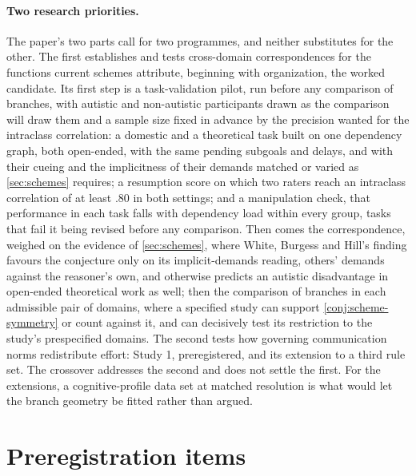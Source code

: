\paragraph{Two research priorities.} The paper's two parts call for two programmes, and neither substitutes for the other. The first establishes and tests cross-domain correspondences for the functions current schemes attribute, beginning with organization, the worked candidate. Its first step is a task-validation pilot, run before any comparison of branches, with autistic and non-autistic participants drawn as the comparison will draw them and a sample size fixed in advance by the precision wanted for the intraclass correlation: a domestic and a theoretical task built on one dependency graph, both open-ended, with the same pending subgoals and delays, and with their cueing and the implicitness of their demands matched or varied as \autoref{sec:schemes} requires; a resumption score on which two raters reach an intraclass correlation of at least $.80$ in both settings; and a manipulation check, that performance in each task falls with dependency load within every group, tasks that fail it being revised before any comparison. Then comes the correspondence, weighed on the evidence of \autoref{sec:schemes}, where White, Burgess and Hill's finding \cite{WhiteBurgessHill2009} favours the conjecture only on its implicit-demands reading, others' demands against the reasoner's own, and otherwise predicts an autistic disadvantage in open-ended theoretical work as well; then the comparison of branches in each admissible pair of domains, where a specified study can support \autoref{conj:scheme-symmetry} or count against it, and can decisively test its restriction to the study's prespecified domains. The second tests how governing communication norms redistribute effort: Study 1, preregistered, and its extension to a third rule set. The crossover addresses the second and does not settle the first. For the extensions, a cognitive-profile data set at matched resolution is what would let the branch geometry be fitted rather than argued.

\printbibliography

\appendix
\section{Preregistration items}
\label{app:prereg}

